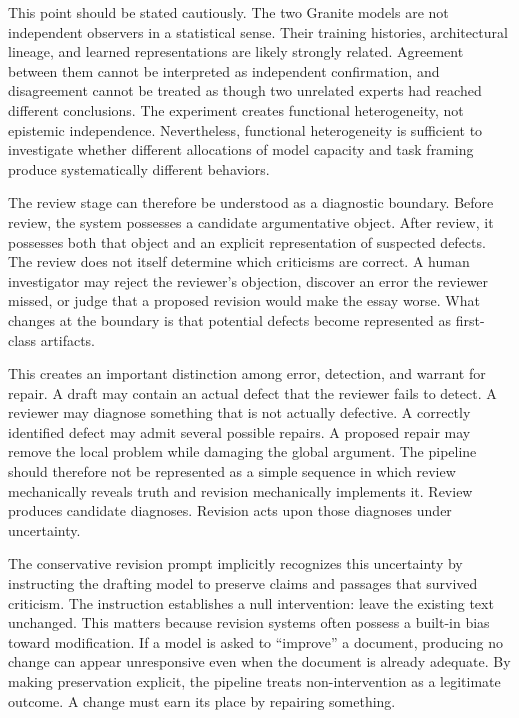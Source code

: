 \documentclass[11pt]{article}
\begin{document}
This point should be stated cautiously. The two Granite models are not independent observers in a statistical sense. Their training histories, architectural lineage, and learned representations are likely strongly related. Agreement between them cannot be interpreted as independent confirmation, and disagreement cannot be treated as though two unrelated experts had reached different conclusions. The experiment creates functional heterogeneity, not epistemic independence. Nevertheless, functional heterogeneity is sufficient to investigate whether different allocations of model capacity and task framing produce systematically different behaviors.

The review stage can therefore be understood as a diagnostic boundary. Before review, the system possesses a candidate argumentative object. After review, it possesses both that object and an explicit representation of suspected defects. The review does not itself determine which criticisms are correct. A human investigator may reject the reviewer's objection, discover an error the reviewer missed, or judge that a proposed revision would make the essay worse. What changes at the boundary is that potential defects become represented as first-class artifacts.

This creates an important distinction among error, detection, and warrant for repair. A draft may contain an actual defect that the reviewer fails to detect. A reviewer may diagnose something that is not actually defective. A correctly identified defect may admit several possible repairs. A proposed repair may remove the local problem while damaging the global argument. The pipeline should therefore not be represented as a simple sequence in which review mechanically reveals truth and revision mechanically implements it. Review produces candidate diagnoses. Revision acts upon those diagnoses under uncertainty.

The conservative revision prompt implicitly recognizes this uncertainty by instructing the drafting model to preserve claims and passages that survived criticism. The instruction establishes a null intervention: leave the existing text unchanged. This matters because revision systems often possess a built-in bias toward modification. If a model is asked to ``improve'' a document, producing no change can appear unresponsive even when the document is already adequate. By making preservation explicit, the pipeline treats non-intervention as a legitimate outcome. A change must earn its place by repairing something.
\end{document}
